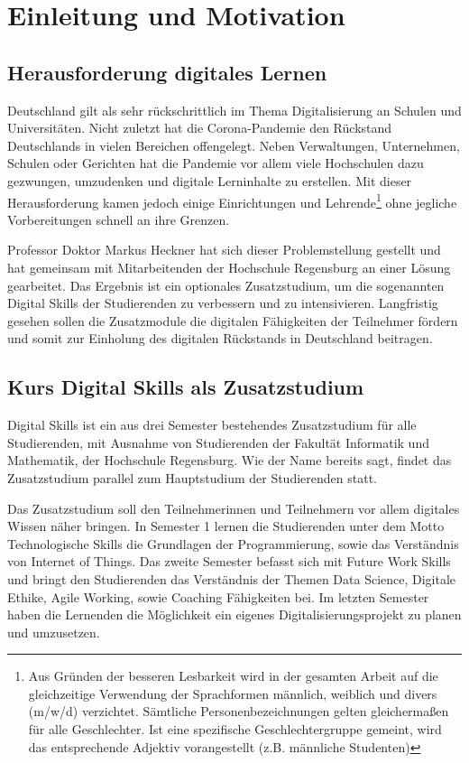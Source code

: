 \section{Einleitung und Motivation}\label{einleitung}
\subsection{Herausforderung digitales Lernen}\label{herausforderung}
Deutschland gilt als sehr rückschrittlich im Thema Digitalisierung an Schulen
und Universitäten. Nicht zuletzt hat die Corona-Pandemie den Rückstand
Deutschlands in vielen Bereichen offengelegt. Neben Verwaltungen, Unternehmen,
Schulen oder Gerichten hat die Pandemie vor allem viele Hochschulen dazu
gezwungen, umzudenken und digitale Lerninhalte zu erstellen. Mit dieser
Herausforderung kamen jedoch einige Einrichtungen und Lehrende\footnote{Aus
Gründen der besseren Lesbarkeit wird in der gesamten Arbeit auf die
gleichzeitige Verwendung der Sprachformen männlich, weiblich und divers (m/w/d)
verzichtet. Sämtliche Personenbezeichnungen gelten gleichermaßen für alle
Geschlechter. Ist eine spezifische Geschlechtergruppe gemeint, wird das
entsprechende Adjektiv vorangestellt (z.B. \glqq männliche Studenten\grqq)} ohne
jegliche Vorbereitungen schnell an ihre Grenzen. \parencite{bmwi-rueckstand}

Professor Doktor Markus Heckner hat sich dieser Problemstellung gestellt und
hat gemeinsam mit Mitarbeitenden der Hochschule Regensburg an einer Lösung
gearbeitet. Das Ergebnis ist ein optionales Zusatzstudium, um die sogenannten
\glqq Digital Skills\grqq{} der Studierenden zu verbessern und zu intensivieren.
Langfristig gesehen sollen die Zusatzmodule die digitalen Fähigkeiten der
Teilnehmer fördern und somit zur Einholung des digitalen Rückstands in
Deutschland beitragen.

\subsection{Kurs Digital Skills als Zusatzstudium}\label{kurs-digital-skills}
Digital Skills ist ein aus drei Semester bestehendes Zusatzstudium für alle
Studierenden, mit Ausnahme von Studierenden der Fakultät Informatik und
Mathematik, der Hochschule Regensburg. Wie der Name bereits sagt, findet das
Zusatzstudium parallel zum Hauptstudium der Studierenden statt.

Das Zusatzstudium soll den Teilnehmerinnen und Teilnehmern vor allem digitales
Wissen näher bringen. In Semester 1 lernen die Studierenden unter dem Motto
\glqq Technologische Skills\grqq{} die Grundlagen der Programmierung, sowie das
Verständnis von Internet of Things. Das zweite Semester befasst sich mit
\glqq Future Work Skills\grqq{} und bringt den Studierenden das Verständnis der
Themen Data Science, Digitale Ethike, Agile Working, sowie Coaching Fähigkeiten
bei. Im letzten Semester haben die Lernenden die Möglichkeit ein eigenes 
Digitalisierungsprojekt zu planen und umzusetzen.

